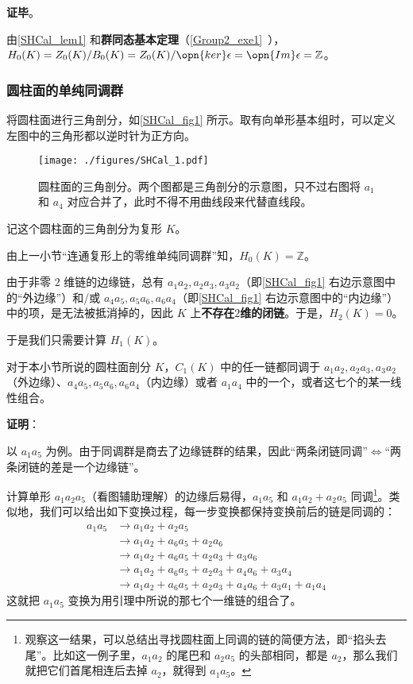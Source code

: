 \textbf{证毕}。

由\autoref{SHCal_lem1} 和\textbf{群同态基本定理}（\autoref{Group2_exe1}~），$H_0(K)=Z_0(K)/B_0(K)=Z_0(K)/\opn{ker}\epsilon=\opn{Im}\epsilon=\mathbb{Z}$。



\subsubsection{圆柱面的单纯同调群}

将圆柱面进行三角剖分，如\autoref{SHCal_fig1} 所示。取有向单形基本组时，可以定义左图中的三角形都以逆时针为正方向。

\begin{figure}[ht]
\centering
\texttt{[image: ./figures/SHCal\_1.pdf]}
\caption{圆柱面的三角剖分。两个图都是三角剖分的示意图，只不过右图将 $a_1$ 和 $a_4$ 对应合并了，此时不得不用曲线段来代替直线段。} \label{SHCal_fig1}
\end{figure}

记这个圆柱面的三角剖分为复形 $K$。

由上一小节“连通复形上的零维单纯同调群”知，$H_0(K)=\mathbb{Z}$。

由于非零 $2$ 维链的边缘链，总有 $a_1a_2, a_2a_3, a_3a_2$（即\autoref{SHCal_fig1} 右边示意图中的“外边缘”）和/或 $a_4a_5, a_5a_6, a_6a_4$（即\autoref{SHCal_fig1} 右边示意图中的“内边缘”）中的项，是无法被抵消掉的，因此 $K$ 上\textbf{不存在}$2$\textbf{维的闭链}。于是，$H_2(K)=0$。

于是我们只需要计算 $H_1(K)$。

\begin{lemma}{}\label{SHCal_lem2}
对于本小节所说的圆柱面剖分 $K$，$C_1(K)$ 中的任一链都同调于 $a_1a_2, a_2a_3, a_3a_2$（外边缘）、$a_4a_5, a_5a_6, a_6a_4$（内边缘）或者 $a_1a_4$ 中的一个，或者这七个的某一线性组合。
\end{lemma}

\textbf{证明}：

以 $a_1a_5$ 为例。由于同调群是商去了边缘链群的结果，因此“两条闭链同调”$\iff$“两条闭链的差是一个边缘链”。

计算单形 $a_1a_2a_5$（看图辅助理解）的边缘后易得，$a_1a_5$ 和 $a_1a_2+a_2a_5$ 同调\footnote{观察这一结果，可以总结出寻找圆柱面上同调的链的简便方法，即“掐头去尾”。比如这一例子里，$a_1a_2$ 的尾巴和 $a_2a_5$ 的头部相同，都是 $a_2$，那么我们就把它们首尾相连后去掉 $a_2$，就得到 $a_1a_5$。}。类似地，我们可以给出如下变换过程，每一步变换都保持变换前后的链是同调的：
\begin{equation}\label{SHCal_eq1}
\begin{aligned}
a_1a_5&\to a_1a_2+a_2a_5\\
&\to a_1a_2+a_6a_5+a_2a_6\\
&\to a_1a_2+a_6a_5+a_2a_3+a_3a_6\\&
\to a_1a_2+a_6a_5+a_2a_3+a_4a_6+a_3a_4\\
&\to a_1a_2+a_6a_5+a_2a_3+a_4a_6+a_3a_1+a_1a_4
\end{aligned}
\end{equation}
这就把 $a_1a_5$ 变换为用引理中所说的那七个一维链的组合了。

